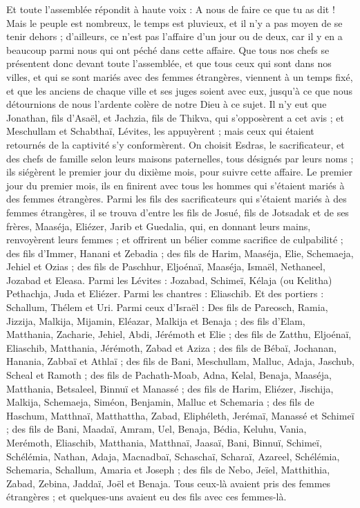 \begin{multicols}{2}
Et toute l'assemblée répondit à haute voix : A nous de faire ce que tu as dit !
Mais le peuple est nombreux, le temps est pluvieux, et il n'y a pas moyen de se tenir dehors ; d’ailleurs, ce n’est pas l’affaire d’un jour ou de deux, car il y en a beaucoup parmi nous qui ont péché dans cette affaire.
Que tous nos chefs se présentent donc devant toute l'assemblée, et que tous ceux qui sont dans nos villes, et qui se sont mariés avec des femmes étrangères, viennent à un temps fixé, et que les anciens de chaque ville et ses juges soient avec eux, jusqu'à ce que nous détournions de nous l'ardente colère de notre Dieu à ce sujet.
Il n'y eut que Jonathan, fils d'Asaël, et Jachzia, fils de Thikva, qui s'opposèrent a cet avis ; et Meschullam et Schabthaï, Lévites, les appuyèrent ;
mais ceux qui étaient retournés de la captivité s’y conformèrent. On choisit Esdras, le sacrificateur, et des chefs de famille selon leurs maisons paternelles, tous désignés par leurs noms ; ils siégèrent le premier jour du dixième mois, pour suivre cette affaire.
Le premier jour du premier mois, ils en finirent avec tous les hommes qui s’étaient mariés à des femmes étrangères.
Parmi les fils des sacrificateurs qui s’étaient mariés à des femmes étrangères, il se trouva d'entre les fils de Josué, fils de Jotsadak et de ses frères, Maaséja, Eliézer, Jarib et Guedalia,
qui, en donnant leurs mains, renvoyèrent leurs femmes ; et offrirent un bélier comme sacrifice de culpabilité ;
des fils d'Immer, Hanani et Zebadia ;
des fils de Harim, Maaséja, Elie, Schemaeja, Jehiel et Ozias ;
des fils de Paschhur, Eljoénaï, Maaséja, Ismaël, Nethaneel, Jozabad et Eleasa.
Parmi les Lévites : Jozabad, Schimeï, Kélaja (ou Kelitha) Pethachja, Juda et Eliézer.
Parmi les chantres : Eliaschib. Et des portiers : Schallum, Thélem et Uri.
Parmi ceux d'Israël : Des fils de Pareosch, Ramia, Jizzija, Malkija, Mijamin, Eléazar, Malkija et Benaja ;
des fils d’Elam, Matthania, Zacharie, Jehiel, Abdi, Jérémoth et Elie ;
des fils de Zatthu, Eljoénaï, Eliaschib, Matthania, Jérémoth, Zabad et Aziza ;
des fils de Bébaï, Jochanan, Hanania, Zabbaï et Athlaï ;
des fils de Bani, Meschullam, Malluc, Adaja, Jaschub, Scheal et Ramoth ;
des fils de Pachath-Moab, Adna, Kelal, Benaja, Maaséja, Matthania, Betsaleel, Binnuï et Manassé ;
des fils de Harim, Eliézer, Jischija, Malkija, Schemaeja, Siméon,
Benjamin, Malluc et Schemaria ;
des fils de Haschum, Matthnaï, Matthattha, Zabad, Eliphéleth, Jerémaï, Manassé et Schimeï ;
des fils de Bani, Maadaï, Amram, Uel,
Benaja, Bédia, Keluhu,
Vania, Merémoth, Eliaschib,
Matthania, Matthnaï, Jaasaï,
Bani, Binnuï, Schimeï,
Schélémia, Nathan, Adaja,
Macnadbaï, Schaschaï, Scharaï,
Azareel, Schélémia, Schemaria,
Schallum, Amaria et Joseph ;
des fils de Nebo, Jeïel, Matthithia, Zabad, Zebina, Jaddaï, Joël et Benaja.
Tous ceux-là avaient pris des femmes étrangères ; et  quelques-uns avaient eu des fils avec ces femmes-là.
\PPE{}
\end{multicols}
